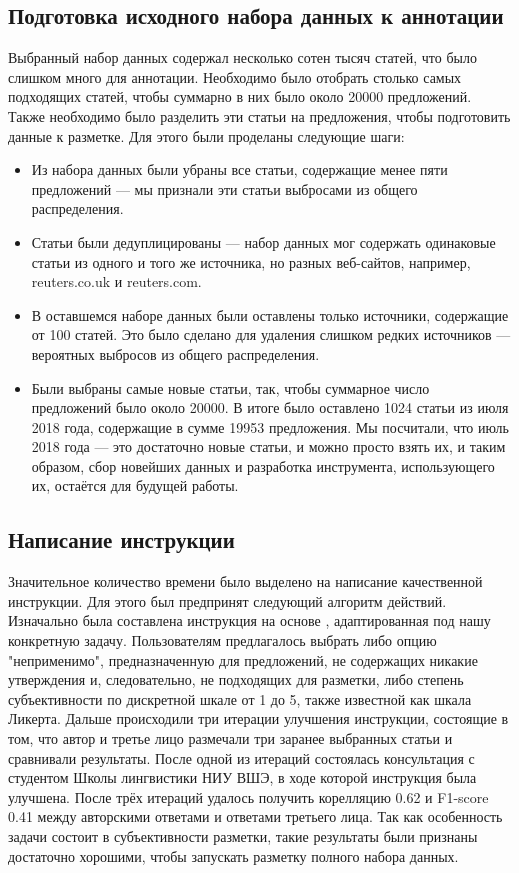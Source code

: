 \documentclass[a4paper,14pt]{extarticle}
\begin{document}
    \subsection{Подготовка исходного набора данных к аннотации}
    Выбранный набор данных содержал несколько сотен тысяч статей, что было слишком много для аннотации. Необходимо было отобрать столько самых подходящих статей, чтобы суммарно в них было около 20000 предложений. Также необходимо было разделить эти статьи на предложения, чтобы подготовить данные к разметке. Для этого были проделаны следующие шаги:
    \begin{itemize}
        \item Из набора данных были убраны все статьи, содержащие менее пяти предложений --- мы признали эти статьи выбросами из общего распределения.
        \item Статьи были дедуплицированы --- набор данных мог содержать одинаковые статьи из одного и того же источника, но разных веб-сайтов, например, reuters.co.uk и reuters.com.
        \item В оставшемся наборе данных были оставлены только источники, содержащие от 100 статей. Это было сделано для удаления слишком редких источников --- вероятных выбросов из общего распределения.
        \item Были выбраны самые новые статьи, так, чтобы суммарное число предложений было около 20000. В итоге было оставлено 1024 статьи из июля 2018 года, содержащие в сумме 19953 предложения. Мы посчитали, что июль 2018 года --- это достаточно новые статьи, и можно просто взять их, и таким образом, сбор новейших данных и разработка инструмента, использующего их, остаётся для будущей работы.
    \end{itemize}
    
    \subsection{Написание инструкции}
    Значительное количество времени было выделено на написание качественной инструкции. Для этого был предпринят следующий алгоритм действий. Изначально была составлена инструкция на основе \cite{annotating-private-states}, адаптированная под нашу конкретную задачу. Пользователям предлагалось выбрать либо опцию "неприменимо", предназначенную для предложений, не содержащих никакие утверждения и, следовательно, не подходящих для разметки, либо степень субъективности по дискретной шкале от 1 до 5, также известной как шкала Ликерта. Дальше происходили три итерации улучшения инструкции, состоящие в том, что автор и третье лицо размечали три заранее выбранных статьи и сравнивали результаты. После одной из итераций состоялась консультация с студентом Школы лингвистики НИУ ВШЭ, в ходе которой инструкция была улучшена. После трёх итераций удалось получить корелляцию 0.62 и F1-score 0.41 между авторскими ответами и ответами третьего лица. Так как особенность задачи состоит в субъективности разметки, такие результаты были признаны достаточно хорошими, чтобы запускать разметку полного набора данных.
    
\end{document}
